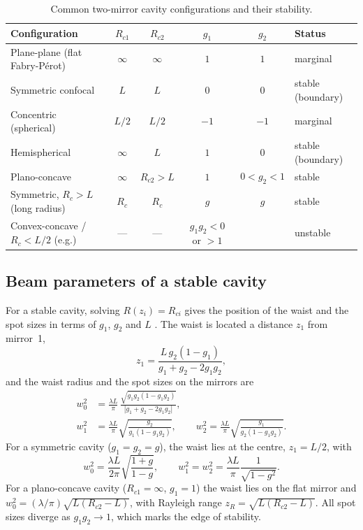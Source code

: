 \documentclass[11pt,a4paper]{article}
\newcommand{\FP}{Fabry-P\'erot}
\begin{document}
	\begin{table}[ht]
		\centering
		\small
		\begin{tabular}{@{}lccccl@{}}
			\toprule
			Configuration & $R_{c1}$ & $R_{c2}$ & $g_1$ & $g_2$ & Status\\
			\midrule
			Plane-plane (flat \FP{}) & $\infty$ & $\infty$ & $1$ & $1$ & marginal\\
			Symmetric confocal & $L$ & $L$ & $0$ & $0$ & stable (boundary)\\
			Concentric (spherical) & $L/2$ & $L/2$ & $-1$ & $-1$ & marginal\\
			Hemispherical & $\infty$ & $L$ & $1$ & $0$ & stable (boundary)\\
			Plano-concave & $\infty$ & $R_{c2}>L$ & $1$ & $0<g_2<1$ & stable\\
			Symmetric, $R_c>L$ (long radius) & $R_c$ & $R_c$ & $g$ & $g$ & stable\\
			Convex-concave / $R_c<L/2$ (e.g.) & --- & --- & $g_1g_2<0$ or $>1$ & & unstable\\
			\bottomrule
		\end{tabular}
		\caption{Common two-mirror cavity configurations and their stability.}
		\label{tab:configs}
	\end{table}
	
	\subsection{Beam parameters of a stable cavity}
	
	For a stable cavity, solving $R(z_i)=R_{ci}$ gives the position of the waist and the spot sizes in terms of $g_1$, $g_2$ and $L$ \cite{KogelnikLi1966,Siegman,Svelto}. The waist is located a distance $z_1$ from mirror~1,
	\begin{equation}
		z_1=\frac{L\,g_2(1-g_1)}{g_1+g_2-2g_1g_2},
	\end{equation}
	and the waist radius and the spot sizes on the mirrors are
	\begin{align}
		w_0^2 &= \frac{\lambda L}{\pi}\,\frac{\sqrt{g_1g_2(1-g_1g_2)}}{\left|g_1+g_2-2g_1g_2\right|},\\
		w_1^2 &= \frac{\lambda L}{\pi}\sqrt{\frac{g_2}{g_1(1-g_1g_2)}}, \qquad
		w_2^2 = \frac{\lambda L}{\pi}\sqrt{\frac{g_1}{g_2(1-g_1g_2)}}.
		\label{eq:spots}
	\end{align}
	For a symmetric cavity ($g_1=g_2=g$), the waist lies at the centre, $z_1=L/2$, with
	\begin{equation}
		w_0^2=\frac{\lambda L}{2\pi}\sqrt{\frac{1+g}{1-g}},\qquad w_1^2=w_2^2=\frac{\lambda L}{\pi}\frac{1}{\sqrt{1-g^2}} .
		\label{eq:symm}
	\end{equation}
	For a plano-concave cavity ($R_{c1}=\infty$, $g_1=1$) the waist lies on the flat mirror and $w_0^2=(\lambda/\pi)\sqrt{L(R_{c2}-L)}$, with Rayleigh range $z_R=\sqrt{L(R_{c2}-L)}$. All spot sizes diverge as $g_1g_2\to1$, which marks the edge of stability.
	
\end{document}
